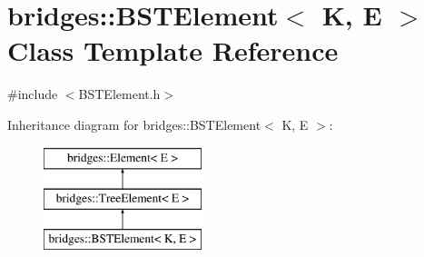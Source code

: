\hypertarget{classbridges_1_1_b_s_t_element}{}\section{bridges\+:\+:B\+S\+T\+Element$<$ K, E $>$ Class Template Reference}
\label{classbridges_1_1_b_s_t_element}


{\ttfamily \#include $<$B\+S\+T\+Element.\+h$>$}

Inheritance diagram for bridges\+:\+:B\+S\+T\+Element$<$ K, E $>$\+:\begin{figure}[H]
\begin{center}
\leavevmode
\includegraphics[height=3.000000cm]{classbridges_1_1_b_s_t_element}
\end{center}
\end{figure}
